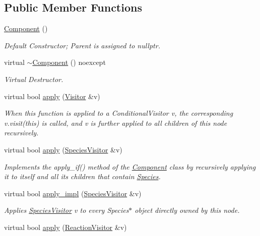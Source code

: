 \subsection*{Public Member Functions}
\begin{DoxyCompactItemize}
\item 
\hyperlink{classComponent_a8775db6d1a2c1afc2e77cd3c8f39da6f}{Component} ()
\begin{DoxyCompactList}\small\item\em Default Constructor; Parent is assigned to nullptr. \end{DoxyCompactList}\item 
virtual \hyperlink{classComponent_afc49d76b286b963c6505809566060440}{$\sim$\+Component} () noexcept
\begin{DoxyCompactList}\small\item\em Virtual Destructor. \end{DoxyCompactList}\item 
virtual bool \hyperlink{classComponent_a06be9328d615af20a155e9060def1470}{apply} (\hyperlink{classVisitor}{Visitor} \&v)
\begin{DoxyCompactList}\small\item\em When this function is applied to a Conditional\+Visitor v, the corresponding v.\+visit(this) is called, and v is further applied to all children of this node recursively. \end{DoxyCompactList}\item 
virtual bool \hyperlink{classComponent_a0f1cd7534ba27c165a1574adc8d422dd}{apply} (\hyperlink{classSpeciesVisitor}{Species\+Visitor} \&v)
\begin{DoxyCompactList}\small\item\em Implements the apply\+\_\+if() method of the \hyperlink{classComponent}{Component} class by recursively applying it to itself and all its children that contain \hyperlink{classSpecies}{Species}. \end{DoxyCompactList}\item 
virtual bool \hyperlink{classComponent_a20f6f5a1f7da3238c069dfc35f174a4b}{apply\+\_\+impl} (\hyperlink{classSpeciesVisitor}{Species\+Visitor} \&v)
\begin{DoxyCompactList}\small\item\em Applies \hyperlink{classSpeciesVisitor}{Species\+Visitor} v to every Species$\ast$ object directly owned by this node. \end{DoxyCompactList}\item 
virtual bool \hyperlink{classComponent_aa911f6c2be71a33eeeb44f03c82cd421}{apply} (\hyperlink{classReactionVisitor}{Reaction\+Visitor} \&v)

\end{DoxyCompactItemize}
